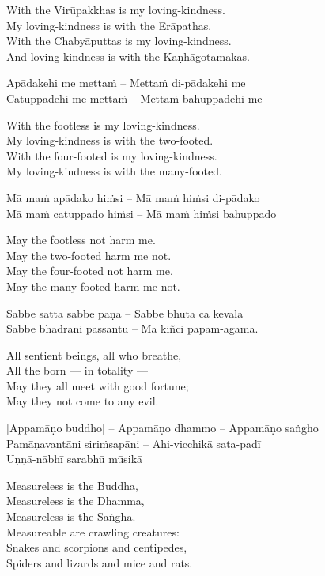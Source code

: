 \begin{english}
  With the Virūpakkhas is my loving-kindness.\\
  My loving-kindness is with the Erāpathas.\\
  With the Chabyāputtas is my loving-kindness.\\
  And loving-kindness is with the Kaṇhāgotamakas.
\end{english}

Apādakehi me mettaṁ – Mettaṁ di-pādakehi me\\
Catuppadehi me mettaṁ – Mettaṁ bahuppadehi me

\begin{english}
  With the footless is my loving-kindness.\\
  My loving-kindness is with the two-footed.\\
  With the four-footed is my loving-kindness.\\
  My loving-kindness is with the many-footed.
\end{english}

Mā maṁ apādako hiṁsi – Mā maṁ hiṁsi di-pādako\\
Mā maṁ catuppado hiṁsi – Mā maṁ hiṁsi bahuppado

\begin{english}
  May the footless not harm me.\\
  May the two-footed harm me not.\\
  May the four-footed not harm me.\\
  May the many-footed harm me not.
\end{english}

Sabbe sattā sabbe pāṇā – Sabbe bhūtā ca kevalā\\
Sabbe bhadrāni passantu – Mā kiñci pāpam-āgamā.

\begin{english}
  All sentient beings, all who breathe,\\
  All the born — in totality —\\
  May they all meet with good fortune;\\
  May they not come to any evil.
\end{english}

[Appamāṇo buddho] – Appamāṇo dhammo – Appamāṇo saṅgho\\
Pamāṇavantāni siriṁsapāni – Ahi-vicchikā sata-padī\\
Uṇṇā-nābhī sarabhū mūsikā

\begin{english}
  Measureless is the Buddha,\\
  Measureless is the Dhamma,\\
  Measureless is the Saṅgha.\\
  Measureable are crawling creatures:\\
  Snakes and scorpions and centipedes,\\
  Spiders and lizards and mice and rats.
\end{english}

